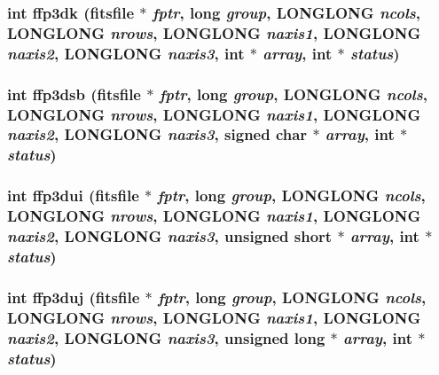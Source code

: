 \subsubsection{\setlength{\rightskip}{0pt plus 5cm}int ffp3dk (\bf{fitsfile} $\ast$ {\em fptr}, long {\em group}, \bf{LONGLONG} {\em ncols}, \bf{LONGLONG} {\em nrows}, \bf{LONGLONG} {\em naxis1}, \bf{LONGLONG} {\em naxis2}, \bf{LONGLONG} {\em naxis3}, int $\ast$ {\em array}, int $\ast$ {\em status})}\label{src_2fitsio_8h_e695cca6e553d21f86ee71051783c338}


\subsubsection{\setlength{\rightskip}{0pt plus 5cm}int ffp3dsb (\bf{fitsfile} $\ast$ {\em fptr}, long {\em group}, \bf{LONGLONG} {\em ncols}, \bf{LONGLONG} {\em nrows}, \bf{LONGLONG} {\em naxis1}, \bf{LONGLONG} {\em naxis2}, \bf{LONGLONG} {\em naxis3}, signed char $\ast$ {\em array}, int $\ast$ {\em status})}\label{src_2fitsio_8h_0f9d96f6b290622b85f3dca6c11ea791}


\subsubsection{\setlength{\rightskip}{0pt plus 5cm}int ffp3dui (\bf{fitsfile} $\ast$ {\em fptr}, long {\em group}, \bf{LONGLONG} {\em ncols}, \bf{LONGLONG} {\em nrows}, \bf{LONGLONG} {\em naxis1}, \bf{LONGLONG} {\em naxis2}, \bf{LONGLONG} {\em naxis3}, unsigned short $\ast$ {\em array}, int $\ast$ {\em status})}\label{src_2fitsio_8h_1dd3e0662151506b0470d7348493663d}


\subsubsection{\setlength{\rightskip}{0pt plus 5cm}int ffp3duj (\bf{fitsfile} $\ast$ {\em fptr}, long {\em group}, \bf{LONGLONG} {\em ncols}, \bf{LONGLONG} {\em nrows}, \bf{LONGLONG} {\em naxis1}, \bf{LONGLONG} {\em naxis2}, \bf{LONGLONG} {\em naxis3}, unsigned long $\ast$ {\em array}, int $\ast$ {\em status})}\label{src_2fitsio_8h_1e610ca12d1921d2b12d1f51184ec1fb}


